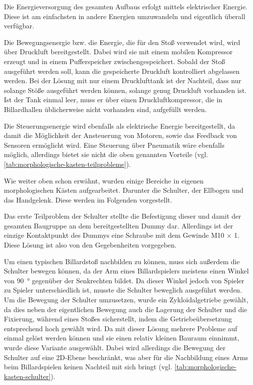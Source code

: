 		Die Energieversorgung des gesamten Aufbaus erfolgt mittels elektrischer Energie. Diese ist am einfachsten in andere Energien umzuwandeln und eigentlich überall verfügbar.\par\medskip
		Die Bewegungsenergie bzw. die Energie, die für den Stoß verwendet wird, wird über Druckluft bereitgestellt. Dabei wird sie mit einem mobilen Kompressor erzeugt und in einem Pufferspeicher zwischengespeichert. Sobald der Stoß ausgeführt werden soll, kann die gespeicherte Druckluft kontrolliert abgelassen werden. Bei der Lösung mit nur einem Drucklufttank ist der Nachteil, dass nur solange Stöße ausgeführt werden können, solange genug Druckluft vorhanden ist. Ist der Tank einmal leer, muss er über einen Druckluftkompressor, die in Billardhallen üblicherweise nicht vorhanden sind, aufgefüllt werden.\par\medskip
		
		Die Steuerungsenergie wird ebenfalls als elektrische Energie bereitgestellt, da damit die Möglichkeit der Ansteuerung von Motoren, sowie das Feedback von Sensoren ermöglicht wird. Eine Steuerung über Pneumatik wäre ebenfalls möglich, allerdings bietet sie nicht die oben genannten Vorteile (vgl. \cref{tab:morphologische-kasten-teilprobleme}).\par\medskip
		
		Wie weiter oben schon erwähnt, wurden einige Bereiche in eigenen morphologischen Kästen aufgearbeitet. Darunter die Schulter, der Ellbogen und das Handgelenk. Diese werden im Folgenden vorgestellt.\par\medskip

		Das erste Teilproblem der Schulter stellte die Befestigung dieser und damit der gesamten Baugruppe an dem bereitgestellten Dummy dar. Allerdings ist der einzige Kontaktpunkt des Dummys eine Schraube mit dem Gewinde M10 $\times$ 1. Diese Lösung ist also von den Gegebenheiten vorgegeben.\par\medskip

		Um einen typischen Billardstoß nachbilden zu können, muss sich außerdem die Schulter bewegen können, da der Arm eines Billardspielers meistens einen Winkel von \SI{90}{\degree} gegenüber der Senkrechten bildet. Da dieser Winkel jedoch von Spieler zu Spieler unterschiedlich ist, musste die Schulter beweglich ausgeführt werden. Um die Bewegung der Schulter umzusetzen, wurde ein Zykloidalgetriebe gewählt, da dies neben der eigentlichen Bewegung auch die Lagerung der Schulter und die Fixierung, während eines Stoßes sicherstellt, indem die Getriebeübersetzung entsprechend hoch gewählt wird. Da mit dieser Lösung mehrere Probleme auf einmal gelöst werden können und sie einen relativ kleinen Bauraum einnimmt, wurde diese Variante ausgewählt. Dabei wird allerdings die Bewegung der Schulter auf eine 2D-Ebene beschränkt, was aber für die Nachbildung eines Arms beim Billardspielen keinen Nachteil mit sich bringt (vgl. \cref{tab:morphologische-kasten-schulter}).\par\medskip

